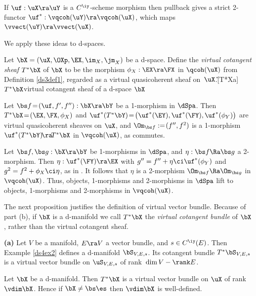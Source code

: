 \documentclass{article}
\begin{document}
\begin{dfn}
If $\uf:\uX\ra\uY$ is a $C^\iy$-scheme morphism then pullback gives
a strict 2-functor
$\uf^*:\vqcoh(\uY)\ra\vqcoh(\uX)$, which maps
$\vvect(\uY)\ra\vvect(\uX)$.
\label{ds4def2}
\end{dfn}

We apply these ideas to d-spaces.

\begin{dfn} Let $\bX=(\uX,\OXp,\EX,\im_X,\jm_X)$ be a d-space. Define
the {\it virtual cotangent sheaf\/} $T^*\bX$ of $\bX$ to be the
morphism $\phi_X:\EX\ra\FX$ in $\qcoh(\uX)$ from Definition
\ref{ds3def1}, regarded as a virtual quasicoherent sheaf
on~$\uX$.\G[T*Xa]{$T^*\bX$}{virtual cotangent sheaf of a d-space
$\bX$}

Let $\bs f\!=\!(\uf,f',f''):\bX\ra\bY$ be a 1-morphism in $\dSpa$.
Then $T^*\bX\!=\!(\EX,\FX,\phi_X)$ and
$\uf^*(T^*\bY)\!=\!\bigl(\uf^*(\EY), \uf^*(\FY),\uf^*(\phi_Y)\bigr)$
are virtual quasicoherent sheaves on $\uX$, and $\Om_{\bs
f}:=\!(f'',f^2)$ is a 1-morphism $\uf^*(T^*\bY)\!\ra\! T^*\bX$ in
$\vqcoh(\uX)$, as  commutes.

Let $\bs f,\bs g:\bX\ra\bY$ be 1-morphisms in $\dSpa$, and $\eta:\bs
f\Ra\bs g$ a 2-morphism. Then $\eta:\uf^*(\FY)\ra\EX$ with
$g''=f''+\eta\ci\uf^*(\phi_Y)$ and $g^2=f^2+\phi_X\ci\eta$, as in
. It follows that $\eta$ is a 2-morphism $\Om_{\bs
f}\Ra\Om_{\bs g}$ in $\vqcoh(\uX)$. Thus, objects, 1-morphisms and
2-morphisms in $\dSpa$ lift to objects, 1-morphisms and 2-morphisms
in $\vqcoh(\uX)$.
\label{ds4def3}
\end{dfn}

The next proposition justifies the definition of virtual vector
bundle. Because of part (b), if $\bX$ is a d-manifold we call
$T^*\bX$ the {\it virtual cotangent bundle\/} of $\bX$, rather than the virtual cotangent
sheaf.

\begin{prop}{\bf(a)} Let\/ $V$ be a manifold, $E\ra V$ a vector
bundle, and\/ $s\in C^\iy(E)$. Then Example\/ {\rm\ref{ds4ex2}}
defines a d-manifold\/ $\bS_{V,E,s}$. Its cotangent bundle
$T^*\bS_{V,E,s}$ is a virtual vector bundle on $\uS_{V,E,s}$ of
rank\/~$\dim V-\rank E$.
\smallskip

 Let\/ $\bX$ be a d-manifold. Then $T^*\bX$ is a
virtual vector bundle on $\uX$ of rank\/ $\vdim\bX$. Hence if\/
$\bX\ne\bs\es$ then $\vdim\bX$ is well-defined.
\label{ds4prop2}
\end{prop}
\end{document}

